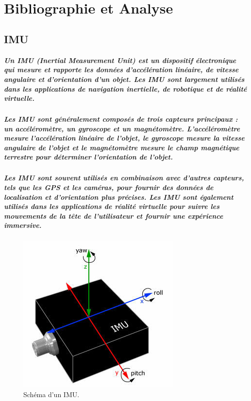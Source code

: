 \chapter{Bibliographie et Analyse}
\label{cp:bibliographie}

\section{IMU}

\paragraph{Un IMU (Inertial Measurement Unit) est un dispositif électronique qui mesure et rapporte les données d'accélération linéaire, de vitesse angulaire et d'orientation d'un objet. Les IMU sont largement utilisés dans les applications de navigation inertielle, de robotique et de réalité virtuelle.}

\paragraph{Les IMU sont généralement composés de trois capteurs principaux : un accéléromètre, un gyroscope et un magnétomètre. L'accéléromètre mesure l'accélération linéaire de l'objet, le gyroscope mesure la vitesse angulaire de l'objet et le magnétomètre mesure le champ magnétique terrestre pour déterminer l'orientation de l'objet.}

\paragraph{Les IMU sont souvent utilisés en combinaison avec d'autres capteurs, tels que les GPS et les caméras, pour fournir des données de localisation et d'orientation plus précises. Les IMU sont également utilisés dans les applications de réalité virtuelle pour suivre les mouvements de la tête de l'utilisateur et fournir une expérience immersive.}

\begin{figure}[!htpb]
    \centering
    \includegraphics[width=0.5\linewidth]{Figures/imu.jpg}
    \caption[Schéma d'un IMU]{Schéma d'un IMU.}
    \label{fig:imu}
\end{figure}


